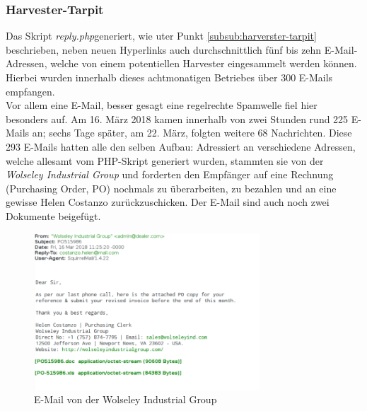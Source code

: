 \subsubsection{Harvester-Tarpit}
Das Skript \emph{reply.php}generiert, wie uter Punkt \ref{subsub:harverster-tarpit} beschrieben, neben neuen Hyperlinks auch durchschnittlich fünf bis zehn E-Mail-Adressen, welche von einem potentiellen Harvester eingesammelt werden können. Hierbei wurden innerhalb dieses achtmonatigen Betriebes über 300 E-Mails empfangen.\\
Vor allem eine E-Mail, besser gesagt eine regelrechte Spamwelle fiel hier besonders auf. Am 16. März 2018 kamen innerhalb von zwei Stunden rund 225 E-Mails an; sechs Tage später, am 22. März, folgten weitere 68 Nachrichten. Diese 293 E-Mails hatten alle den selben Aufbau: Adressiert an verschiedene Adressen, welche allesamt vom PHP-Skript generiert wurden, stammten sie von der \emph{Wolseley Industrial Group} und forderten den Empfänger auf eine Rechnung (Purchasing Order, PO) nochmals zu überarbeiten, zu bezahlen und an eine gewisse Helen Costanzo zurückzuschicken. Der E-Mail sind auch noch zwei Dokumente beigefügt.
\begin{figure}[H]
	\centering
	\includegraphics[width=8.45cm]{img/wolseley-industrial-group.png}
	\caption{E-Mail von der Wolseley Industrial Group}
	\label{fig:Wolseley_Industrial_Group}
\end{figure}
